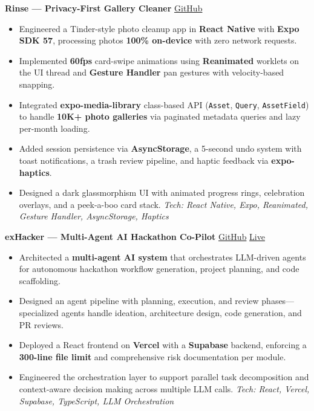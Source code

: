 \documentclass[a4paper,10pt]{article}
\begin{document}
\textbf{Rinse — Privacy-First Gallery Cleaner} \quad
\href{https://github.com/Muneer320/Rinse}{GitHub}
\begin{itemize}[leftmargin=2.2em]
    \item Engineered a Tinder-style photo cleanup app in \textbf{React Native} with \textbf{Expo SDK 57}, processing photos \textbf{100\% on-device} with zero network requests.
    \item Implemented \textbf{60fps} card-swipe animations using \textbf{Reanimated} worklets on the UI thread and \textbf{Gesture Handler} pan gestures with velocity-based snapping.
    \item Integrated \textbf{expo-media-library} class-based API (\texttt{Asset}, \texttt{Query}, \texttt{AssetField}) to handle \textbf{10K+ photo galleries} via paginated metadata queries and lazy per-month loading.
    \item Added session persistence via \textbf{AsyncStorage}, a 5-second undo system with toast notifications, a trash review pipeline, and haptic feedback via \textbf{expo-haptics}.
    \item Designed a dark glassmorphism UI with animated progress rings, celebration overlays, and a peek-a-boo card stack.
    \textit{Tech: React Native, Expo, Reanimated, Gesture Handler, AsyncStorage, Haptics}
\end{itemize}

\vspace{1mm}

\textbf{exHacker — Multi-Agent AI Hackathon Co-Pilot} \quad
\href{https://github.com/Muneer320/exhacker-frontend}{GitHub} \quad
\href{https://exhacker-frontend.vercel.app}{Live}
\begin{itemize}[leftmargin=2.2em]
    \item Architected a \textbf{multi-agent AI system} that orchestrates LLM-driven agents for autonomous hackathon workflow generation, project planning, and code scaffolding.
    \item Designed an agent pipeline with planning, execution, and review phases---specialized agents handle ideation, architecture design, code generation, and PR reviews.
    \item Deployed a React frontend on \textbf{Vercel} with a \textbf{Supabase} backend, enforcing a \textbf{300-line file limit} and comprehensive risk documentation per module.
    \item Engineered the orchestration layer to support parallel task decomposition and context-aware decision making across multiple LLM calls.
    \textit{Tech: React, Vercel, Supabase, TypeScript, LLM Orchestration}
\end{itemize}
\end{document}
